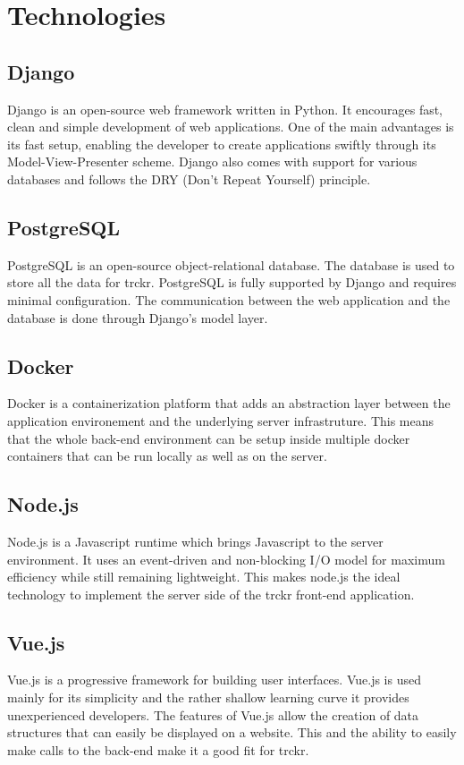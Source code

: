 \documentclass[bibliography=totoc, listof=totocnumbered]{scrartcl}
\begin{document}
\section{Technologies}
\subsection{Django}
Django is an open-source web framework written in Python.\cite{django} It
encourages fast, clean and simple development of web applications. One of the
main advantages is its fast setup, enabling the developer to create applications
swiftly through its Model-View-Presenter scheme. Django also comes with support
for various databases and follows the DRY (Don't Repeat Yourself) principle.

\subsection{PostgreSQL}
PostgreSQL is an open-source object-relational database.\cite{postgre} The
database is used to store all the data for trckr. PostgreSQL is fully supported
by Django and requires minimal configuration. The communication between the web
application and the database is done through Django's model layer.

\subsection{Docker}
Docker is a containerization platform that adds an abstraction layer between the
application environement and the underlying server infrastruture.\cite{docker}
This means that the whole back-end environment can be setup inside multiple
docker containers that can be run locally as well as on the server.

\subsection{Node.js}
Node.js is a Javascript runtime which brings Javascript to the server
environment.\cite{nodejs} It uses an event-driven and non-blocking I/O model for
maximum efficiency while still remaining lightweight. This makes node.js the
ideal technology to implement the server side of the trckr front-end application.

\subsection{Vue.js}
Vue.js is a progressive framework for building user interfaces.\cite{vuejs}
Vue.js is used mainly for its simplicity and the rather shallow learning curve
it provides unexperienced developers. The features of Vue.js allow
the creation of data structures that can easily be displayed on a website. This
and the ability to easily make calls to the back-end make it a good fit for
trckr.
\end{document}
